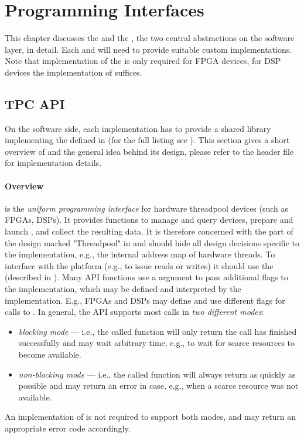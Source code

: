 \section{Programming Interfaces}\label{sec:apis}%
This chapter discusses the  and the , the two central abstractions on the software layer, in detail.
Each  and  will need to provide suitable custom implementations.
Note that implementation of the  is only required for FPGA devices, for DSP devices the implementation of  suffices.

\subsection{TPC API}\label{sec:ai-tapascoapi}%
On the software side, each  implementation has to provide a shared library implementing the  defined in  (for the full listing see ).
This section gives a short overview of  and the general idea behind its design, please refer to the header file for implementation details.

\paragraph{Overview}
 is the \emph{uniform programming interface} for hardware threadpool devices (such as FPGAs, DSPs).
It provides functions to manage and query devices, prepare and launch , and collect the resulting data.
It is therefore concerned with the part of the design marked "Threadpool" in  and should hide all design decisions specific to the  implementation, e.g., the internal address map of hardware threads.
To interface with the platform (e.g., to issue reads or writes) it should use the  (described in ).
Many API functions use a  argument to pass additional flags to the implementation, which may be defined and interpreted by the implementation.
E.g., FPGAs and DSPs may define and use different flags for calls to .
In general, the API supports most calls in \emph{two different modes}:
%
\begin{itemize}
  \item \emph{blocking mode} ---  i.e., the called function will only return the call has finished successfully and may wait arbitrary time, e.g., to wait for scarce resources to become available.
  \item \emph{non-blocking mode} --- i.e., the called function will always return as quickly as possible and may return an error in case, e.g., when a scarce resource was not available.
\end{itemize}
%
An implementation of  is not required to support both modes, and may return an appropriate error code accordingly.
